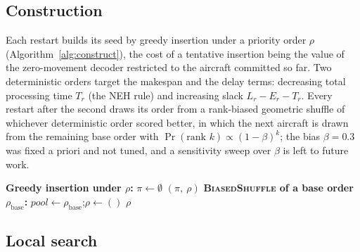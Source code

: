 \subsection{Construction}
\label{sec:igvnd_construction}

Each restart builds its seed by greedy insertion under a priority order
$\rho$ (Algorithm~\ref{alg:construct}), the cost of a tentative
insertion being the value of the zero-movement decoder restricted to the
aircraft committed so far.  Two deterministic orders target the makespan
and the delay terms: decreasing total processing time $T_r$ (the NEH
rule) and increasing slack $L_r - E_r - T_r$.  Every restart after the
second draws its order from a rank-biased geometric shuffle of whichever
deterministic order scored better, in which the next aircraft is drawn
from the remaining base order with $\Pr(\text{rank } k) \propto
(1-\beta)^k$; the bias $\beta = 0.3$ was fixed a priori and not tuned,
and a sensitivity sweep over $\beta$ is left to future work.

\begin{algorithm}[htbp]
\DontPrintSemicolon
{}
\textbf{Greedy insertion under $\rho$:}\;
\Indp
  $\pi \leftarrow \emptyset$\;
  \Return $(\pi,\ \rho)$\;
\Indm
\BlankLine
\textbf{\textsc{BiasedShuffle} of a base order $\rho_{\mathrm{base}}$:}\;
\Indp
  $\mathit{pool} \leftarrow \rho_{\mathrm{base}}$;\quad $\rho \leftarrow ()$\;
  \Return $\rho$ 
\Indm
\caption{\textsc{Construct} --- greedy insertion and the biased shuffle.}
\label{alg:construct}
\end{algorithm}

\subsection{Local search}
\label{sec:igvnd_vnd}

